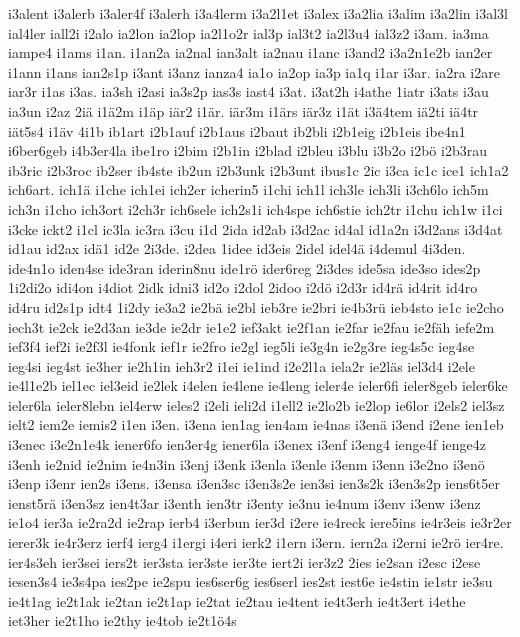 {i3alent
i3alerb
i3aler4f
i3alerh
i3a4lerm
i3a2l1et
i3alex
i3a2lia
i3alim
i3a2lin
i3al3l
ial4ler
iall2i
i2alo
ia2lon
ia2lop
ia2l1o2r
ial3p
ial3t2
ia2l3u4
ial3z2
i3am.
ia3ma
iampe4
i1ams
i1an.
i1an2a
ia2nal
ian3alt
ia2nau
i1anc
i3and2
i3a2n1e2b
ian2er
i1ann
i1ans
ian2s1p
i3ant
i3anz
ianza4
ia1o
ia2op
ia3p
ia1q
i1ar
i3ar.
ia2ra
i2are
iar3r
i1as
i3as.
ia3sh
i2asi
ia3s2p
ias3s
iast4
i3at.
i3at2h
i4athe
1iatr
i3ats
i3au
ia3un
i2az
2iä
i1ä2m
i1äp
iär2
i1är.
iär3m
i1ärs
iär3z
i1ät
i3ä4tem
iä2ti
iä4tr
iät5s4
i1äv
4i1b
ib1art
i2b1auf
i2b1aus
i2baut
ib2bli
i2b1eig
i2b1eis
ibe4n1
i6ber6geb
i4b3er4la
ibe1ro
i2bim
i2b1in
i2blad
i2bleu
i3blu
i3b2o
i2bö
i2b3rau
ib3ric
i2b3roc
ib2ser
ib4ste
ib2un
i2b3unk
i2b3unt
ibus1c
2ic
i3ca
ic1c
ice1
ich1a2
ich6art.
ich1ä
i1che
ich1ei
ich2er
icherin5
i1chi
ich1l
ich3le
ich3li
i3ch6lo
ich5m
ich3n
i1cho
ich3ort
i2ch3r
ich6sele
ich2s1i
ich4spe
ich6stie
ich2tr
i1chu
ich1w
i1ci
i3cke
ickt2
i1cl
ic3la
ic3ra
i3cu
i1d
2ida
id2ab
i3d2ac
id4al
id1a2n
i3d2ans
i3d4at
id1au
id2ax
idä1
id2e
2i3de.
i2dea
1idee
id3eis
2idel
idel4ä
i4demul
4i3den.
ide4n1o
iden4se
ide3ran
iderin8nu
ide1rö
ider6reg
2i3des
ide5sa
ide3so
ides2p
1i2di2o
idi4on
i4diot
2idk
idni3
id2o
i2dol
2idoo
i2dö
i2d3r
id4rä
id4rit
id4ro
id4ru
id2s1p
idt4
1i2dy
ie3a2
ie2bä
ie2bl
ieb3re
ie2bri
ie4b3rü
ieb4sto
ie1c
ie2cho
iech3t
ie2ck
ie2d3an
ie3de
ie2dr
ie1e2
ief3akt
ie2f1an
ie2far
ie2fau
ie2fäh
iefe2m
ief3f4
ief2i
ie2f3l
ie4fonk
ief1r
ie2fro
ie2gl
ieg5li
ie3g4n
ie2g3re
ieg4s5c
ieg4se
ieg4si
ieg4st
ie3her
ie2h1in
ieh3r2
i1ei
ie1ind
i2e2l1a
iela2r
ie2läs
iel3d4
i2ele
ie4l1e2b
iel1ec
iel3eid
ie2lek
i4elen
ie4lene
ie4leng
ieler4e
ieler6fi
ieler8geb
ieler6ke
ieler6la
ieler8lebn
iel4erw
ieles2
i2eli
ieli2d
i1ell2
ie2lo2b
ie2lop
ie6lor
i2els2
iel3sz
ielt2
iem2e
iemis2
i1en
i3en.
i3ena
ien1ag
ien4am
ie4nas
i3enä
i3end
i2ene
ien1eb
i3enec
i3e2n1e4k
iener6fo
ien3er4g
iener6la
i3enex
i3enf
i3eng4
ienge4f
ienge4z
i3enh
ie2nid
ie2nim
ie4n3in
i3enj
i3enk
i3enla
i3enle
i3enm
i3enn
i3e2no
i3enö
i3enp
i3enr
ien2s
i3ens.
i3ensa
i3en3sc
i3en3s2e
ien3si
ien3s2k
i3en3s2p
iens6t5er
ienst5rä
i3en3sz
ien4t3ar
i3enth
ien3tr
i3enty
ie3nu
ie4num
i3env
i3enw
i3enz
ie1o4
ier3a
ie2ra2d
ie2rap
ierb4
i3erbun
ier3d
i2ere
ie4reck
iere5ins
ie4r3eis
ie3r2er
ierer3k
ie4r3erz
ierf4
ierg4
i1ergi
i4eri
ierk2
i1ern
i3ern.
iern2a
i2erni
ie2rö
ier4re.
ier4s3eh
ier3sei
iers2t
ier3sta
ier3ste
ier3te
iert2i
ier3z2
2ies
ie2san
i2esc
i2ese
iesen3s4
ie3s4pa
ies2pe
ie2spu
ies6ser6g
ies6serl
ies2st
iest6e
ie4stin
ie1str
ie3su
ie4t1ag
ie2t1ak
ie2tan
ie2t1ap
ie2tat
ie2tau
ie4tent
ie4t3erh
ie4t3ert
i4ethe
iet3her
ie2t1ho
ie2thy
ie4tob
ie2t1ö4s
}
